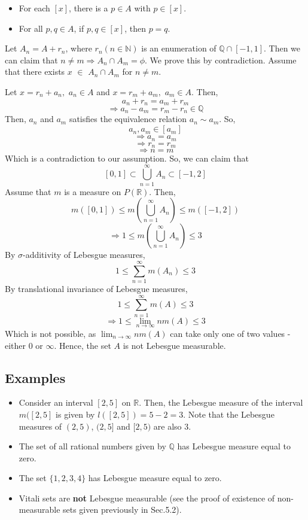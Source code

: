 \documentclass{article}
\begin{document}
\begin{itemize}
	\item For each $[x]$, there is a $p \in A$ with $p \in [x]$.
	\item For all $p, q \in A$, if $p, q \in [x]$, then $p = q$.
\end{itemize}

Let $A_n = A + r_n$, where $r_n (n \in \mathbb{N})$ is an enumeration of $\mathbb{Q} \cap [-1,1]$. Then we can claim that $n \neq m \Rightarrow A_n \cap A_m = \phi$. We prove this by contradiction. Assume that there exists $x$ $\in$ $A_n \cap A_m$ for $n \neq m$.

Let $x = r_n + a_n,$ $a_n \in A$ and $x= r_m + a_m,$ $a_m \in A$. Then,
$$a_n + r_n = a_m + r_m$$
$$\Rightarrow a_n - a_m = r_m - r_n \in \mathbb{Q}$$
Then, $a_n$ and $a_m$ satisfies the equivalence relation $a_n \sim a_m$. So,
$$a_n, a_m \in [a_m]$$
$$\Rightarrow a_n = a_m$$
$$\Rightarrow r_n = r_m$$
$$\Rightarrow n = m$$
Which is a contradiction to our assumption. So, we can claim that 
$$[0, 1] \subset \bigcup\limits_{n=1}^\infty A_n \subset [-1, 2]$$
Assume that $m$ is a measure on $P(\mathbb{R})$. Then,
$$m([0, 1]) \leq m(\bigcup\limits_{n=1}^\infty A_n) \leq m([-1, 2])$$
$$\Rightarrow 1 \leq m(\bigcup\limits_{n=1}^\infty A_n) \leq 3 $$
By $\sigma$-additivity of Lebesgue measures,
$$1 \leq \sum\limits_{n=1}^\infty m(A_n) \leq 3$$
By translational invariance of Lebesgue measures,
$$1 \leq \sum\limits_{n=1}^\infty m(A) \leq 3 $$
$$\Rightarrow 1 \leq \lim_{n \rightarrow \infty} n m(A) \leq 3 $$
Which is not possible, as $\lim_{n \rightarrow \infty} n m(A)$ can take only one of two values - either 0 or $\infty$. Hence, the set $A$ is not Lebesgue measurable.

\subsection{Examples}
\begin{itemize}
	\item Consider an interval $[2, 5]$ on $\mathbb{R}$. Then, the Lebesgue measure of the interval $m([2, 5]$ is given by $l([2, 5]) = 5 - 2 = 3$. Note that the Lebesgue measures of $(2, 5)$, $(2, 5]$ and $[2, 5)$ are also 3.
	\item The set of all rational numbers given by $\mathbb{Q}$ has Lebesgue measure equal to zero.
	\item The set $\{1, 2, 3, 4\}$ has Lebesgue measure equal to zero.
	\item Vitali sets are \textbf{not} Lebesgue measurable (see the proof of existence of non-measurable sets given previously in Sec.5.2).
\end{itemize}
\end{document}
